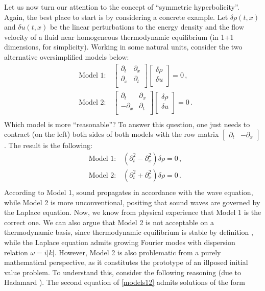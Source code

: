 \documentclass[a4paper, amsfonts, amssymb, amsmath, reprint, showkeys, nofootinbib, twoside, onecolumn,notitlepage]{revtex4-1}
\begin{document}
Let us now turn our attention to the concept of ``symmetric hyperbolicity''. Again, the best place to start is by considering a concrete example. Let $\delta\rho(t,x)$ and $\delta u(t,x)$ be the linear perturbations to the energy density and the flow velocity of a fluid near homogeneous thermodynamic equilibrium (in 1+1 dimensions, for simplicity). Working in some natural units, consider the two alternative oversimplified models below:
\begin{equation}\label{Model12}
\begin{split}
& \text{Model 1:} \quad 
\begin{bmatrix}
\partial_t & \partial_x \\
\partial_x & \partial_t \\
\end{bmatrix}
\begin{bmatrix}
\delta \rho \\
\delta u \\
\end{bmatrix}=0 \, , \\
& \text{Model 2:} \quad
\begin{bmatrix}
\partial_t & \partial_x \\
-\partial_x & \partial_t \\
\end{bmatrix}
\begin{bmatrix}
\delta \rho \\
\delta u \\
\end{bmatrix} =0 \, .\\
\end{split}
\end{equation} 
Which model is more ``reasonable''? To answer this question, one just needs to contract (on the left) both sides of both models with the row matrix 
$\begin{bmatrix}
\partial_t & -\partial_x
\end{bmatrix}$. The result is the following:
\begin{equation}\label{models12}
\begin{split}
& \text{Model 1:} \quad (\partial^2_t -\partial^2_x)\delta \rho=0 \, ,\\
& \text{Model 2:} \quad (\partial^2_t +\partial^2_x)\delta \rho =0 \, .\\
\end{split}
\end{equation}
According to Model 1, sound propagates in accordance with the wave equation, while Model 2 is more unconventional, positing that sound waves are governed by the Laplace equation. Now, we know from physical experience that Model 1 is the correct one. We can also argue that Model 2 is not acceptable on a thermodynamic basis, since thermodynamic equilibrium is stable by definition \cite{Hiscock_Insatibility_first_order,GavassinoBounds2023}, while the Laplace equation admits growing Fourier modes with dispersion relation $\omega=i|k|$. However, Model 2 is also problematic from a purely mathematical perspective, as it constitutes the prototype of an illposed initial value problem. To understand this, consider the following reasoning (due to Hadamard \cite{Joseph1990}). The second equation of \eqref{models12} admits solutions of the form 
\end{document}
